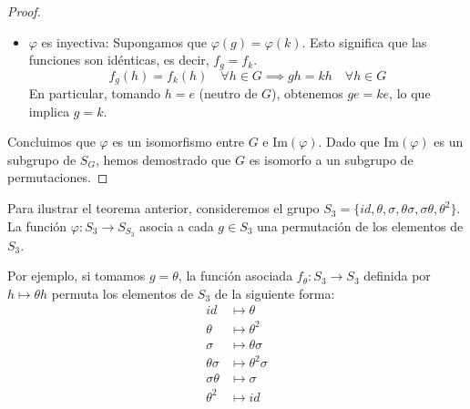 \begin{proof}
\begin{itemize}
        \item $\varphi$ es inyectiva:
        Supongamos que $\varphi(g) = \varphi(k)$. Esto significa que las funciones son idénticas, es decir, $f_g = f_k$.
        \[ f_g(h) = f_k(h) \quad \forall h \in G \implies gh = kh \quad \forall h \in G \]
        En particular, tomando $h = e$ (neutro de $G$), obtenemos $ge = ke$, lo que implica $g = k$.
    \end{itemize}

    Concluimos que $\varphi$ es un isomorfismo entre $G$ e $\text{Im}(\varphi)$. Dado que $\text{Im}(\varphi)$ es un subgrupo de $S_G$, hemos demostrado que $G$ es isomorfo a un subgrupo de permutaciones.
\end{proof}

\begin{eje}
    Para ilustrar el teorema anterior, consideremos el grupo $S_3 = \{id, \theta, \sigma, \theta\sigma, \sigma\theta, \theta^2\}$.
    La función $\varphi: S_3 \to S_{S_3}$ asocia a cada $g \in S_3$ una permutación de los elementos de $S_3$.
    
    Por ejemplo, si tomamos $g = \theta$, la función asociada $f_\theta: S_3 \to S_3$ definida por $h \mapsto \theta h$ permuta los elementos de $S_3$ de la siguiente forma:
    \begin{align*}
        id &\mapsto \theta \\
        \theta &\mapsto \theta^2 \\
        \sigma &\mapsto \theta\sigma \\
        \theta\sigma &\mapsto \theta^2\sigma \\
        \sigma\theta &\mapsto \sigma  \\
        \theta^2 &\mapsto id
    \end{align*}
\end{eje}


